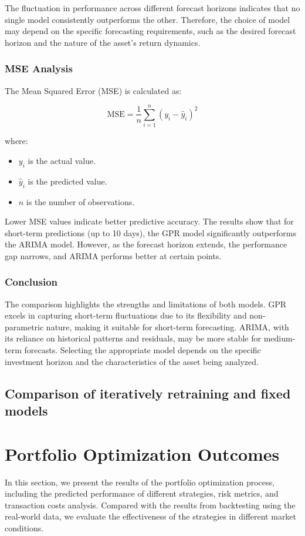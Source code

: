 The fluctuation in performance across different forecast horizons indicates that no single model consistently outperforms the other. Therefore, the choice of model may depend on the specific forecasting requirements, such as the desired forecast horizon and the nature of the asset's return dynamics.

\subsubsection{MSE Analysis}

The Mean Squared Error (MSE) is calculated as:

\[
\text{MSE} = \frac{1}{n} \sum_{i=1}^{n} (y_i - \hat{y}_i)^2
\]

where:
\begin{itemize}
    \item \( y_i \) is the actual value.
    \item \( \hat{y}_i \) is the predicted value.
    \item \( n \) is the number of observations.
\end{itemize}

Lower MSE values indicate better predictive accuracy. The results show that for short-term predictions (up to 10 days), the GPR model significantly outperforms the ARIMA model. However, as the forecast horizon extends, the performance gap narrows, and ARIMA performs better at certain points.

\subsubsection{Conclusion}

The comparison highlights the strengths and limitations of both models. GPR excels in capturing short-term fluctuations due to its flexibility and non-parametric nature, making it suitable for short-term forecasting. ARIMA, with its reliance on historical patterns and residuals, may be more stable for medium-term forecasts. Selecting the appropriate model depends on the specific investment horizon and the characteristics of the asset being analyzed.


\subsection{Comparison of iteratively retraining and fixed models}


\section{Portfolio Optimization Outcomes}
In this section, we present the results of the portfolio optimization process, including the predicted performance of different strategies, risk metrics, and transaction costs analysis. Compared with the results from backtesting using the real-world data, we evaluate the effectiveness of the strategies in different market conditions.



